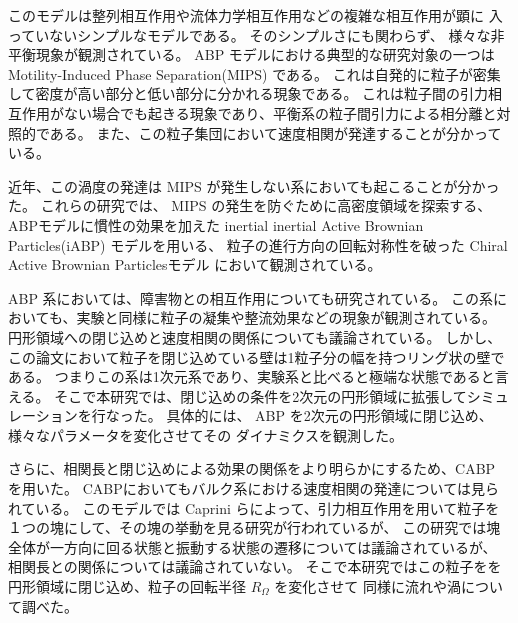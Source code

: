 \documentclass[/Users/ikedahajime/GitHub/reserch/master_report/thesis]{subfiles}
\begin{document}
このモデルは整列相互作用や流体力学相互作用などの複雑な相互作用が顕に
入っていないシンプルなモデルである。%
そのシンプルさにも関わらず、
様々な非平衡現象が観測されている。%
ABP モデルにおける典型的な研究対象の一つは Motility-Induced Phase Separation(MIPS) である。
これは自発的に粒子が密集して密度が高い部分と低い部分に分かれる現象である。
これは粒子間の引力相互作用がない場合でも起きる現象であり、平衡系の粒子間引力による相分離と対照的である。
また、この粒子集団において速度相関が発達することが分かっている。


近年、この渦度の発達は MIPS が発生しない系においても起こることが分かった。
これらの研究では、 MIPS の発生を防ぐために高密度領域を探索する\cite{szamelLongrangedVelocityCorrelations2021}、
ABPモデルに慣性の効果を加えた inertial inertial Active Brownian Particles(iABP) モデルを用いる\cite{kurodaAnomalousFluctuationsHomogeneous2023}、
粒子の進行方向の回転対称性を破った Chiral Active Brownian Particlesモデル\cite{kurodaLongrangeTranslationalOrder2024}
において観測されている。

ABP 系においては、障害物との相互作用についても研究されている。
この系においても、実験と同様に粒子の凝集や整流効果などの現象が観測されている。
円形領域への閉じ込めと速度相関の関係についても議論されている\cite{capriniCollectiveEffectsConfined2021}。
しかし、この論文において粒子を閉じ込めている壁は1粒子分の幅を持つリング状の壁である。
つまりこの系は1次元系であり、実験系と比べると極端な状態であると言える。
そこで本研究では、閉じ込めの条件を2次元の円形領域に拡張してシミュレーションを行なった。
具体的には、 ABP を2次元の円形領域に閉じ込め、様々なパラメータを変化させてその
ダイナミクスを観測した。


さらに、相関長と閉じ込めによる効果の関係をより明らかにするため、CABP を用いた。
CABPにおいてもバルク系における速度相関の発達については見られている\cite{kurodaLongrangeTranslationalOrder2024}。
このモデルでは Caprini らによって、引力相互作用を用いて粒子を１つの塊にして、その塊の挙動を見る研究が行われている\cite{capriniSelfrevertingVorticesChiral2024}が、
この研究では塊全体が一方向に回る状態と振動する状態の遷移については議論されているが、
相関長との関係については議論されていない。
そこで本研究ではこの粒子をを円形領域に閉じ込め、粒子の回転半径 $R_\Omega$ を変化させて
同様に流れや渦について調べた。
\end{document}

